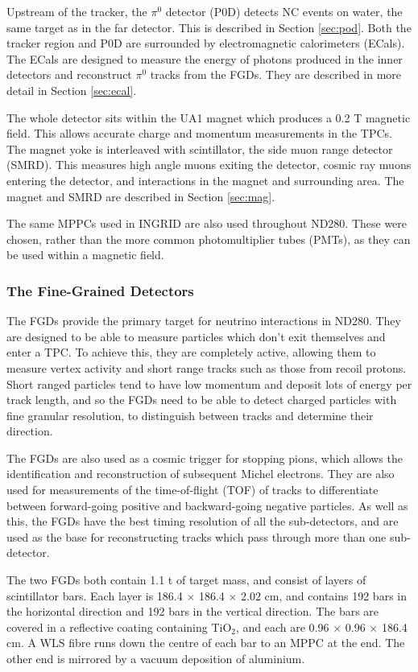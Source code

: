 Upstream of the tracker, the $\pi^0$ detector (P0D) detects NC events on water, the same target as in the far detector. This is described in Section \ref{sec:pod}. Both the tracker region and P0D are surrounded by electromagnetic calorimeters (ECals). The ECals are designed to measure the energy of photons produced in the inner detectors and reconstruct $\pi^0$ tracks from the FGDs. They are described in more detail in Section \ref{sec:ecal}.

The whole detector sits within the UA1 magnet which produces a 0.2 T magnetic field. This allows accurate charge and momentum measurements in the TPCs. The magnet yoke is interleaved with scintillator, the side muon range detector (SMRD). This measures high angle muons exiting the detector, cosmic ray muons entering the detector, and interactions in the magnet and surrounding area. The magnet and SMRD are described in Section \ref{sec:mag}.

The same MPPCs used in INGRID are also used throughout ND280. These were chosen, rather than the more common photomultiplier tubes (PMTs), as they can be used within a magnetic field. 

\subsubsection{The Fine-Grained Detectors}\label{sec:fgd}

The FGDs provide the primary target for neutrino interactions in ND280. They are designed to be able to measure particles which don't exit themselves and enter a TPC. To achieve this, they are completely active, allowing them to measure vertex activity and short range tracks such as those from recoil protons. Short ranged particles tend to have low momentum and deposit lots of energy per track length, and so the FGDs need to be able to detect charged particles with fine granular resolution, to distinguish between tracks and determine their direction. 

The FGDs are also used as a cosmic trigger for stopping pions, which allows the identification and reconstruction of subsequent Michel electrons. They are also used for measurements of the time-of-flight (TOF) of tracks to differentiate between forward-going positive and backward-going negative particles. As well as this, the FGDs have the best timing resolution of all the sub-detectors, and are used as the base for reconstructing tracks which pass through more than one sub-detector. 

The two FGDs both contain 1.1 t of target mass, and consist of layers of scintillator bars. Each layer is 186.4 $\times$ 186.4 $\times$ 2.02 cm, and contains 192 bars in the horizontal direction and 192 bars in the vertical direction. The bars are covered in a reflective coating containing TiO$_2$, and each are 0.96 $\times$ 0.96 $\times$ 186.4 cm. A WLS fibre runs down the centre of each bar to an MPPC at the end. The other end is mirrored by a vacuum deposition of aluminium.

